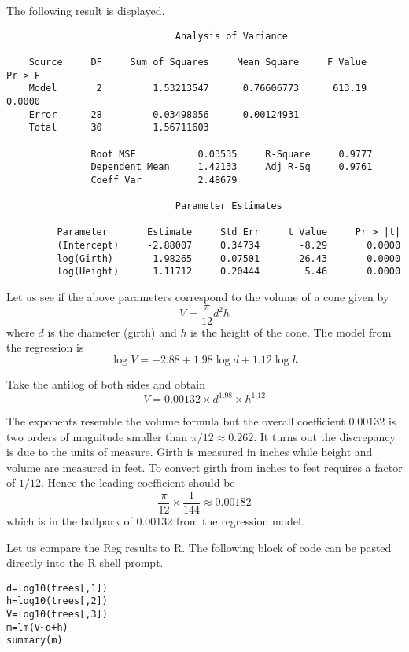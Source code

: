 \documentclass[12pt]{article}
\begin{document}
The following result is displayed.

{\scriptsize\begin{verbatim}
                              Analysis of Variance

    Source     DF     Sum of Squares     Mean Square     F Value     Pr > F
    Model       2         1.53213547      0.76606773      613.19     0.0000
    Error      28         0.03498056      0.00124931                       
    Total      30         1.56711603                                       

               Root MSE           0.03535     R-Square     0.9777
               Dependent Mean     1.42133     Adj R-Sq     0.9761
               Coeff Var          2.48679                        

                              Parameter Estimates

         Parameter       Estimate     Std Err     t Value     Pr > |t|
         (Intercept)     -2.88007     0.34734       -8.29       0.0000
         log(Girth)       1.98265     0.07501       26.43       0.0000
         log(Height)      1.11712     0.20444        5.46       0.0000
\end{verbatim}}

Let us see if the above parameters correspond to the volume of a cone
given by
$$
V=\frac{\pi}{12}d^2h
$$
where $d$ is the diameter (girth) and $h$ is the height of the cone.
The model from the regression is
$$
\log V=-2.88+1.98\log d+1.12\log h
$$

Take the antilog of both sides and obtain
$$
V=0.00132\times d^{1.98}\times h^{1.12}
$$

The exponents resemble the volume formula but the overall coefficient 0.00132
is two orders of magnitude smaller than $\pi/12\approx0.262$.
It turns out the discrepancy is due to the units of measure.
Girth is measured in inches while height and volume are measured in feet.
To convert girth from inches to feet requires a factor of $1/12$.
Hence the leading coefficient should be
$$
\frac{\pi}{12}\times\frac{1}{144}\approx0.00182
$$
which is in the ballpark of 0.00132 from the regression model.

\bigskip

Let us compare the Reg results to R.
The following block of code can be pasted directly into the R shell prompt.

{\scriptsize\begin{verbatim}
d=log10(trees[,1])
h=log10(trees[,2])
V=log10(trees[,3])
m=lm(V~d+h)
summary(m)
\end{verbatim}}
\end{document}
